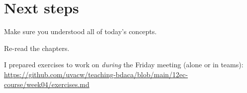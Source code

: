 
\section{Next steps}

\begin{frame}[standout]
Make sure you understood all of today's concepts.

Re-read the chapters.

I prepared exercises to work on \emph{during} the Friday meeting (alone or in teams):
\large{\url{https://github.com/uvacw/teaching-bdaca/blob/main/12ec-course/week04/exercises.md}}
\end{frame}





\begin{frame}
	\printbibliography
\end{frame}




